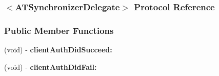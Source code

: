 \hypertarget{protocol_a_t_synchronizer_delegate-p}{
\subsubsection{$<$ATSynchronizerDelegate$>$ Protocol Reference}
\label{protocol_a_t_synchronizer_delegate-p}
}
\subsubsection*{Public Member Functions}
\begin{DoxyCompactItemize}
\item 
\hypertarget{protocol_a_t_synchronizer_delegate-p_a5ef10b52a53f28e5f16cb76c2e9af9b8}{
(void) -\/ {\bfseries clientAuthDidSucceed:}}
\label{protocol_a_t_synchronizer_delegate-p_a5ef10b52a53f28e5f16cb76c2e9af9b8}

\item 
\hypertarget{protocol_a_t_synchronizer_delegate-p_a25d978a721f2bd286b9e063a1987f45d}{
(void) -\/ {\bfseries clientAuthDidFail:}}
\label{protocol_a_t_synchronizer_delegate-p_a25d978a721f2bd286b9e063a1987f45d}

\end{DoxyCompactItemize}
